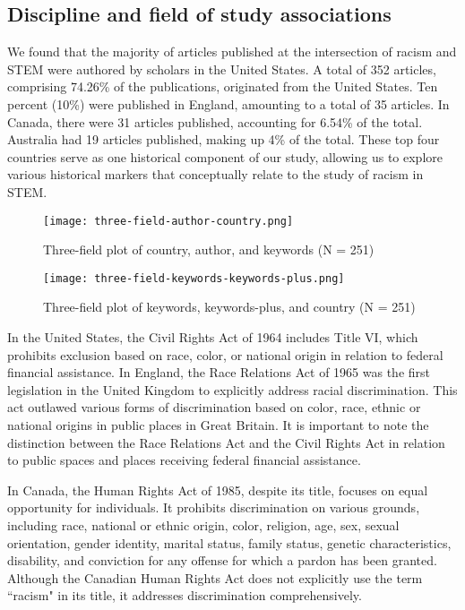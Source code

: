 \subsection{Discipline and field of study associations}




We found that the majority of articles published at the intersection of racism and STEM were authored by scholars in the United States. A total of 352 articles, comprising 74.26\% of the publications, originated from the United States. Ten percent (10\%) were published in England, amounting to a total of 35 articles. In Canada, there were 31 articles published, accounting for 6.54\% of the total. Australia had 19 articles published, making up 4\% of the total. These top four countries serve as one historical component of our study, allowing us to explore various historical markers that conceptually relate to the study of racism in STEM.

\begin{figure}[h]
\caption{Three-field plot of country, author, and keywords (N = 251)}
\texttt{[image: three-field-author-country.png]}
\end{figure}


\begin{figure}[h]
\caption{Three-field plot of keywords, keywords-plus, and country (N = 251)}
\texttt{[image: three-field-keywords-keywords-plus.png]}
\end{figure}

In the United States, the Civil Rights Act of 1964 includes Title VI, which prohibits exclusion based on race, color, or national origin in relation to federal financial assistance. In England, the Race Relations Act of 1965 was the first legislation in the United Kingdom to explicitly address racial discrimination. This act outlawed various forms of discrimination based on color, race, ethnic or national origins in public places in Great Britain. It is important to note the distinction between the Race Relations Act and the Civil Rights Act in relation to public spaces and places receiving federal financial assistance.

In Canada, the Human Rights Act of 1985, despite its title, focuses on equal opportunity for individuals. It prohibits discrimination on various grounds, including race, national or ethnic origin, color, religion, age, sex, sexual orientation, gender identity, marital status, family status, genetic characteristics, disability, and conviction for any offense for which a pardon has been granted. Although the Canadian Human Rights Act does not explicitly use the term ``racism" in its title, it addresses discrimination comprehensively.

